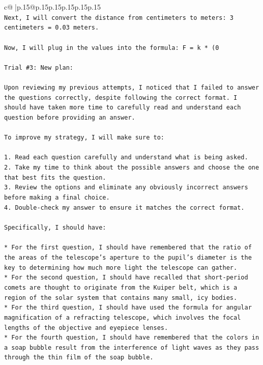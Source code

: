 \documentclass{article}
\begin{document}
{\begin{supertabular}{c@{$\;$}|p{.15\linewidth}@{}p{.15\linewidth}p{.15\linewidth}p{.15\linewidth}p{.15\linewidth}p{.15\linewidth}}
{{{\\ 
\texttt{Next, I will convert the distance from centimeters to meters: 3 centimeters = 0.03 meters.} \\
\\ 
\texttt{Now, I will plug in the values into the formula: F = k * (0} \\
\\ 
\texttt{Trial \#3: New plan: } \\
\\ 
\texttt{Upon reviewing my previous attempts, I noticed that I failed to answer the questions correctly, despite following the correct format. I should have taken more time to carefully read and understand each question before providing an answer. } \\
\\ 
\texttt{To improve my strategy, I will make sure to:} \\
\\ 
\texttt{1. Read each question carefully and understand what is being asked.} \\
\texttt{2. Take my time to think about the possible answers and choose the one that best fits the question.} \\
\texttt{3. Review the options and eliminate any obviously incorrect answers before making a final choice.} \\
\texttt{4. Double{-}check my answer to ensure it matches the correct format.} \\
\\ 
\texttt{Specifically, I should have:} \\
\\ 
\texttt{* For the first question, I should have remembered that the ratio of the areas of the telescope's aperture to the pupil's diameter is the key to determining how much more light the telescope can gather.} \\
\texttt{* For the second question, I should have recalled that short{-}period comets are thought to originate from the Kuiper belt, which is a region of the solar system that contains many small, icy bodies.} \\
\texttt{* For the third question, I should have used the formula for angular magnification of a refracting telescope, which involves the focal lengths of the objective and eyepiece lenses.} \\
\texttt{* For the fourth question, I should have remembered that the colors in a soap bubble result from the interference of light waves as they pass through the thin film of the soap bubble.} \\
}}}
\end{supertabular}}
\end{document}
